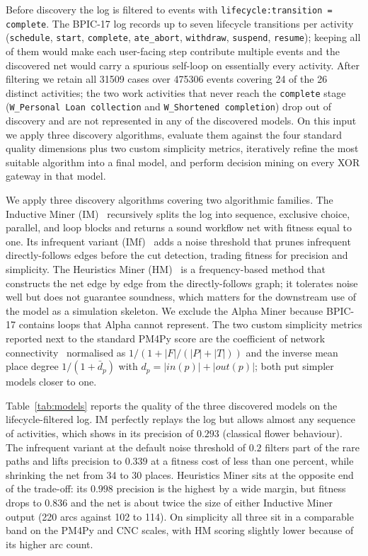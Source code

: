 \documentclass[
  english,        %
  font=times,     %
  twocolumn,      %
]{tumarticle}
\begin{document}
Before discovery the log is filtered to events with \texttt{lifecycle:transition\,=\,complete}. The BPIC-17 log records up to seven lifecycle transitions per activity (\texttt{schedule}, \texttt{start}, \texttt{complete}, \texttt{ate\_abort}, \texttt{withdraw}, \texttt{suspend}, \texttt{resume}); keeping all of them would make each user-facing step contribute multiple events and the discovered net would carry a spurious self-loop on essentially every activity. After filtering we retain all \num{31509} cases over \num{475306} events covering \num{24} of the \num{26} distinct activities; the two work activities that never reach the \texttt{complete} stage (\mbox{\texttt{W\_Personal Loan collection}} and \mbox{\texttt{W\_Shortened completion}}) drop out of discovery and are not represented in any of the discovered models. On this input we apply three discovery algorithms, evaluate them against the four standard quality dimensions plus two custom simplicity metrics, iteratively refine the most suitable algorithm into a final model, and perform decision mining on every XOR gateway in that model.

We apply three discovery algorithms covering two algorithmic families. The Inductive Miner (IM)~\cite{leemans2013inductive} recursively splits the log into sequence, exclusive choice, parallel, and loop blocks and returns a sound workflow net with fitness equal to one. Its infrequent variant (IMf)~\cite{leemans2014infrequent} adds a noise threshold that prunes infrequent directly-follows edges before the cut detection, trading fitness for precision and simplicity. The Heuristics Miner (HM)~\cite{weijters2006heuristics} is a frequency-based method that constructs the net edge by edge from the directly-follows graph; it tolerates noise well but does not guarantee soundness, which matters for the downstream use of the model as a simulation skeleton. We exclude the Alpha Miner because BPIC-17 contains loops that Alpha cannot represent. The two custom simplicity metrics reported next to the standard PM4Py score are the coefficient of network connectivity~\cite{carmona2018conformance} normalised as $1/(1+|F|/(|P|+|T|))$ and the inverse mean place degree $1/(1+\bar d_p)$ with $d_p = |\mathit{in}(p)| + |\mathit{out}(p)|$; both put simpler models closer to one.

Table~\ref{tab:models} reports the quality of the three discovered models on the lifecycle-filtered log. IM perfectly replays the log but allows almost any sequence of activities, which shows in its precision of $0.293$ (classical flower behaviour). The infrequent variant at the default noise threshold of $0.2$ filters part of the rare paths and lifts precision to $0.339$ at a fitness cost of less than one percent, while shrinking the net from 34 to 30 places. Heuristics Miner sits at the opposite end of the trade-off: its $0.998$ precision is the highest by a wide margin, but fitness drops to $0.836$ and the net is about twice the size of either Inductive Miner output (220 arcs against 102 to 114). On simplicity all three sit in a comparable band on the PM4Py and CNC scales, with HM scoring slightly lower because of its higher arc count.
\end{document}
